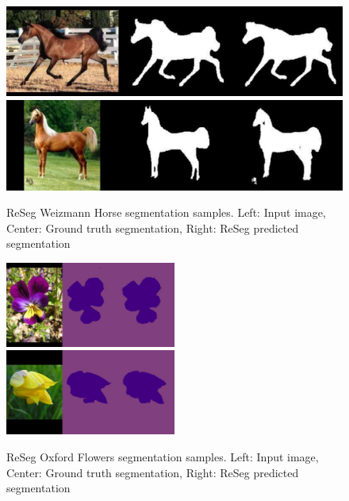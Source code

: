 
\begin{figure}[t!]
    \centering
    \includegraphics[width=\textwidth]{img/reseg/samples/horse1.pdf}\\
    \vspace{0.1em}
    \includegraphics[width=\textwidth]{img/reseg/samples/horse2.pdf}
    \caption{ReSeg Weizmann Horse segmentation samples.
        Left: Input image, Center: Ground truth segmentation,
        Right: ReSeg predicted segmentation}
    \label{fig:reseg_samples_horses}
\end{figure}

\begin{figure}[t!]
    \centering
    \includegraphics[width=0.5\textwidth]{img/reseg/samples/flowers1.jpg}\\
    \vspace{0.1em}
    \includegraphics[width=0.5\textwidth]{img/reseg/samples/flowers2.jpg}
    \caption{ReSeg Oxford Flowers segmentation samples.
        Left: Input image, Center: Ground truth segmentation,
        Right: ReSeg predicted segmentation}
    \label{fig:reseg_samples_flowers}
\end{figure}

